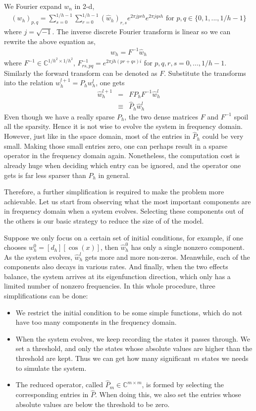 \documentclass{article}
\begin{document}
 We Fourier expand $w_n$ in
2-d,
\begin{eqnarray}
(w_h)_{p,q} =\sum_{s=0}^{1/h-1} \sum_{r=0}^{1/h-1} (\hat{w}_h)_{r,s}
e^{2 \pi j p rh} e^{2 \pi j q sh}  \mbox{   for }p,q \in
\{0,1,...,1/h-1\}
\end{eqnarray}
where $j = \sqrt{-1}$. The inverse discrete Fourier transform is
linear so we can rewrite the above equation as,
\begin{eqnarray}
w_h = F^{-1} \hat{w}_h
\end{eqnarray}
where $F^{-1} \in \mathbb{C}^{1/h^2 \times 1/h^2}$, $F^{-1}_{rs,pq}
=e^{2 \pi j h ({pr}+{qs}) i}$ for $p,q,r,s = 0,...,1/h-1$. Similarly the
forward transform can be denoted as $F$. Substitute the transforms
into the relation $w_h^{l+1} = P_h w_h^l$, one gets
\begin{eqnarray}
\hat{w}_h^{l+1} &=&F P_h F^{-1} \hat{w}_h^l \nonumber\\
          &\equiv& \hat{P}_h \hat{w}_h^l
\end{eqnarray}
Even though we have a really sparse $P_h$, the two dense matrices
$F$ and $F^{-1}$ spoil all the sparsity. Hence it is not wise to
evolve the system in frequency domain. However, just like in the
space domain, most of the entries in $\hat{P}_h$ could be very small.
Making those small entries zero, one can perhaps result in a sparse
operator in the frequency domain again. Nonetheless, the computation
cost is already huge when deciding which entry can be ignored, and
the operator one gets is far less sparser than $P_h$ in general.

Therefore, a further simplification is required to make the problem
more achievable. Let us start from observing what the most important
components are in frequency domain when a system evolves. Selecting
these components out of the others is our basic strategy to reduce
the size of of the model.


Suppose we only focus on a certain set of initial conditions, for
example, if one chooses $w_h^0 = [d_h][\cos(x)]$, then $\hat{w}_h^0$
has only a single nonzero component. As the system evolves,
$\hat{w}_h^l$ gets more and more non-zeros. Meanwhile, each of the
components also decays in various rates. And finally, when the two
effects balance, the system arrives at its eigenfunction direction,
which only has a limited number of nonzero frequencies. In this
whole procedure, three simplifications can be done:
\begin{itemize}
  \item We restrict the initial condition to be some simple
  functions, which do not have too many components in the frequency
  domain.
  \item When the system evolves, we keep recording the states it
  passes through. We set a threshold, and only the states whose
  absolute values are higher than the threshold are kept. Thus we can get how
  many significant $m$ states we needs to simulate the system.
  \item The reduced operator, called $\hat{P}_m \in \mathbb{C}^{m \times m}$,
  is formed by selecting the corresponding entries in $\hat{P}$. When
  doing this, we also set the entries whose absolute values are
  below the threshold to be zero.
\end{itemize}
\end{document}
